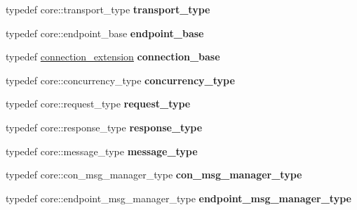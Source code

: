 \begin{DoxyCompactItemize}
\item 
typedef core\+::transport\+\_\+type {\bfseries transport\+\_\+type}\hypertarget{structstub__config_aaada21529a6fe3cb91d8621b4b6f77ff}{}\label{structstub__config_aaada21529a6fe3cb91d8621b4b6f77ff}

\item 
typedef core\+::endpoint\+\_\+base {\bfseries endpoint\+\_\+base}\hypertarget{structstub__config_a9f66dcbba94c7b2d45f366bec76c596f}{}\label{structstub__config_a9f66dcbba94c7b2d45f366bec76c596f}

\item 
typedef \hyperlink{structconnection__extension}{connection\+\_\+extension} {\bfseries connection\+\_\+base}\hypertarget{structstub__config_a3dc8556489744a239e858da91a224a5e}{}\label{structstub__config_a3dc8556489744a239e858da91a224a5e}

\item 
typedef core\+::concurrency\+\_\+type {\bfseries concurrency\+\_\+type}\hypertarget{structstub__config_adfbabf7bc98d14349e3aaf93ce286679}{}\label{structstub__config_adfbabf7bc98d14349e3aaf93ce286679}

\item 
typedef core\+::request\+\_\+type {\bfseries request\+\_\+type}\hypertarget{structstub__config_adf25cb289c00f17e0edde3ee14c7d513}{}\label{structstub__config_adf25cb289c00f17e0edde3ee14c7d513}

\item 
typedef core\+::response\+\_\+type {\bfseries response\+\_\+type}\hypertarget{structstub__config_af5bf09e5641cb374d09ca1cc57a3db68}{}\label{structstub__config_af5bf09e5641cb374d09ca1cc57a3db68}

\item 
typedef core\+::message\+\_\+type {\bfseries message\+\_\+type}\hypertarget{structstub__config_a608dd8f08c2967a1279f862646d5ccfe}{}\label{structstub__config_a608dd8f08c2967a1279f862646d5ccfe}

\item 
typedef core\+::con\+\_\+msg\+\_\+manager\+\_\+type {\bfseries con\+\_\+msg\+\_\+manager\+\_\+type}\hypertarget{structstub__config_ac54fff1ce93b9e96d7c55f7a5f7070b6}{}\label{structstub__config_ac54fff1ce93b9e96d7c55f7a5f7070b6}

\item 
typedef core\+::endpoint\+\_\+msg\+\_\+manager\+\_\+type {\bfseries endpoint\+\_\+msg\+\_\+manager\+\_\+type}\hypertarget{structstub__config_a41f4e1a5902c7a558e4f06b223bff9e3}{}\label{structstub__config_a41f4e1a5902c7a558e4f06b223bff9e3}


\end{DoxyCompactItemize}
